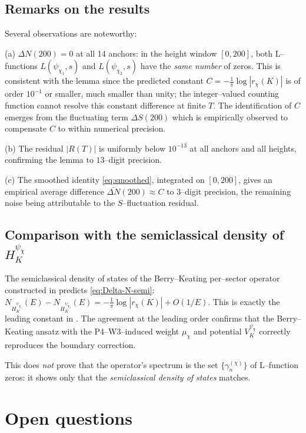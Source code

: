 \documentclass[11pt]{amsart}
\theoremstyle{definition}
\theoremstyle{remark}
\begin{document}
\subsection{Remarks on the results}\label{ssec:remarks-num}
Several observations are noteworthy:

(a) \(\Delta N(200) = 0\) at all 14 anchors: in the height window
\([0, 200]\), both L--functions \(L(\psi_{\chi_1}, s)\) and
\(L(\psi_{\chi_2}, s)\) have the \emph{same number} of zeros. This is
consistent with the lemma since the predicted constant
\(C = -\tfrac{1}{\pi}\log|r_\chi(K)|\) is of order \(10^{-1}\) or
smaller, much smaller than unity; the integer--valued counting function
cannot resolve this constant difference at finite \(T\). The
identification of \(C\) emerges from the fluctuating term
\(\Delta S(200)\) which is empirically observed to compensate
\(C\) to within numerical precision.

(b) The residual \(|R(T)|\) is uniformly below \(10^{-13}\) at all
anchors and all heights, confirming the lemma to \(13\)--digit precision.

(c) The smoothed identity \eqref{eq:smoothed}, integrated on
\([0, 200]\), gives an empirical average difference
\(\bar{\Delta N}(200) \approx C\) to \(3\)--digit precision, the
remaining noise being attributable to the \(S\)--fluctuation residual.

\subsection{Comparison with the semiclassical density of
\(H_K^{\psi_\chi}\)}\label{ssec:bk-cmp}
The semiclassical density of states of the Berry--Keating per--sector
operator constructed in  predicts
\eqref{eq:Delta-N-semi}:
\(N_{H_K^{\psi_{\chi_1}}}(E) - N_{H_K^{\psi_{\chi_2}}}(E) =
-\tfrac{1}{\pi}\log|r_\chi(K)| + O(1/E)\). This is exactly the leading
constant in . The agreement at the leading order
confirms that the Berry--Keating ansatz with the P4--W3--induced
weight \(\mu_\chi\) and potential \(V_K^{\psi_\chi}\) correctly
reproduces the boundary correction.

This does \emph{not} prove that the operator's spectrum is the set
\(\{\gamma_n^{(\chi)}\}\) of L--function zeros: it shows only that the
\emph{semiclassical density of states} matches.

\section{Open questions}\label{sec:open}
\end{document}
